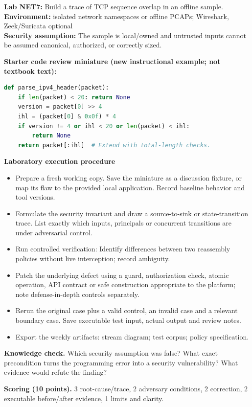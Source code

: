 \documentclass[10pt,letterpaper]{article}
\begin{document}
\begin{insight}\textbf{Lab NET7:} Build a trace of TCP sequence overlap in an offline sample.\\\textbf{Environment:} isolated network namespaces or offline PCAPs; Wireshark, Zeek/Suricata optional\\\textbf{Security assumption:} The sample is local/owned and untrusted inputs cannot be assumed canonical, authorized, or correctly sized.\end{insight}
\textbf{Starter code review miniature (new instructional example; not textbook text):}
\begin{lstlisting}[language=Python]
def parse_ipv4_header(packet):
    if len(packet) < 20: return None
    version = packet[0] >> 4
    ihl = (packet[0] & 0x0f) * 4
    if version != 4 or ihl < 20 or len(packet) < ihl:
        return None
    return packet[:ihl]  # Extend with total-length checks.
\end{lstlisting}
\textbf{Laboratory execution procedure}
\begin{itemize}[leftmargin=*,itemsep=2pt]
\item Prepare a fresh working copy. Save the miniature as a discussion fixture, or map its flaw to the provided local application. Record baseline behavior and tool versions.
\item Formulate the security invariant and draw a source-to-sink or state-transition trace. List exactly which inputs, principals or concurrent transitions are under adversarial control.
\item Run controlled verification: Identify differences between two reassembly policies without live interception; record ambiguity.
\item Patch the underlying defect using a guard, authorization check, atomic operation, API contract or safe construction appropriate to the platform; note defense-in-depth controls separately.
\item Rerun the original case plus a valid control, an invalid case and a relevant boundary case. Save executable test input, actual output and review notes.
\item Export the weekly artifacts: stream diagram; test corpus; policy specification.
\end{itemize}
\textbf{Knowledge check.} Which security assumption was false? What exact precondition turns the programming error into a security vulnerability? What evidence would refute the finding?

\textbf{Scoring (10 points).} 3 root-cause/trace, 2 adversary conditions, 2 correction, 2 executable before/after evidence, 1 limits and clarity.
\end{document}
